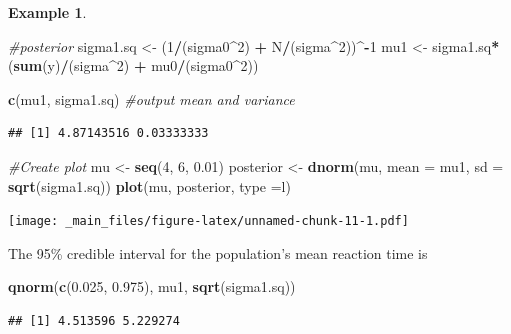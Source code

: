 \documentclass[
]{book}
\newenvironment{Shaded}{\begin{snugshade}}{\end{snugshade}}
\newcommand{\AttributeTok}[1]{\textcolor[rgb]{0.13,0.29,0.53}{#1}}
\newcommand{\CommentTok}[1]{\textcolor[rgb]{0.56,0.35,0.01}{\textit{#1}}}
\newcommand{\DecValTok}[1]{\textcolor[rgb]{0.00,0.00,0.81}{#1}}
\newcommand{\FloatTok}[1]{\textcolor[rgb]{0.00,0.00,0.81}{#1}}
\newcommand{\FunctionTok}[1]{\textcolor[rgb]{0.13,0.29,0.53}{\textbf{#1}}}
\newcommand{\NormalTok}[1]{#1}
\newcommand{\OtherTok}[1]{\textcolor[rgb]{0.56,0.35,0.01}{#1}}
\newcommand{\SpecialCharTok}[1]{\textcolor[rgb]{0.81,0.36,0.00}{\textbf{#1}}}
\newcommand{\StringTok}[1]{\textcolor[rgb]{0.31,0.60,0.02}{#1}}
\theoremstyle{definition}
\theoremstyle{definition}
\newtheorem{example}{Example}[chapter]
\theoremstyle{definition}
\theoremstyle{definition}
\theoremstyle{remark}
\begin{document}
\begin{example}
\begin{Shaded}
\begin{Highlighting}[]
\CommentTok{\#posterior}
\NormalTok{sigma1.sq }\OtherTok{\textless{}{-}}\NormalTok{ (}\DecValTok{1}\SpecialCharTok{/}\NormalTok{(sigma0}\SpecialCharTok{\^{}}\DecValTok{2}\NormalTok{)  }\SpecialCharTok{+}\NormalTok{ N}\SpecialCharTok{/}\NormalTok{(sigma}\SpecialCharTok{\^{}}\DecValTok{2}\NormalTok{))}\SpecialCharTok{\^{}{-}}\DecValTok{1}
\NormalTok{mu1       }\OtherTok{\textless{}{-}}\NormalTok{ sigma1.sq}\SpecialCharTok{*}\NormalTok{(}\FunctionTok{sum}\NormalTok{(y)}\SpecialCharTok{/}\NormalTok{(sigma}\SpecialCharTok{\^{}}\DecValTok{2}\NormalTok{) }\SpecialCharTok{+}\NormalTok{ mu0}\SpecialCharTok{/}\NormalTok{(sigma0}\SpecialCharTok{\^{}}\DecValTok{2}\NormalTok{))}

\FunctionTok{c}\NormalTok{(mu1, sigma1.sq) }\CommentTok{\#output mean and variance}
\end{Highlighting}
\end{Shaded}

\begin{verbatim}
## [1] 4.87143516 0.03333333
\end{verbatim}

\begin{Shaded}
\begin{Highlighting}[]
\CommentTok{\#Create plot}
\NormalTok{mu }\OtherTok{\textless{}{-}} \FunctionTok{seq}\NormalTok{(}\DecValTok{4}\NormalTok{, }\DecValTok{6}\NormalTok{, }\FloatTok{0.01}\NormalTok{)}
\NormalTok{posterior }\OtherTok{\textless{}{-}} \FunctionTok{dnorm}\NormalTok{(mu, }\AttributeTok{mean =}\NormalTok{ mu1, }\AttributeTok{sd =} \FunctionTok{sqrt}\NormalTok{(sigma1.sq))}
\FunctionTok{plot}\NormalTok{(mu, posterior, }\AttributeTok{type =}\StringTok{\textquotesingle{}l\textquotesingle{}}\NormalTok{)}
\end{Highlighting}
\end{Shaded}

\texttt{[image: \_main\_files/figure-latex/unnamed-chunk-11-1.pdf]}

The 95\% credible interval for the population's mean reaction time is

\begin{Shaded}
\begin{Highlighting}[]
\FunctionTok{qnorm}\NormalTok{(}\FunctionTok{c}\NormalTok{(}\FloatTok{0.025}\NormalTok{, }\FloatTok{0.975}\NormalTok{), mu1, }\FunctionTok{sqrt}\NormalTok{(sigma1.sq))}
\end{Highlighting}
\end{Shaded}

\begin{verbatim}
## [1] 4.513596 5.229274
\end{verbatim}

\end{example}
\end{document}
